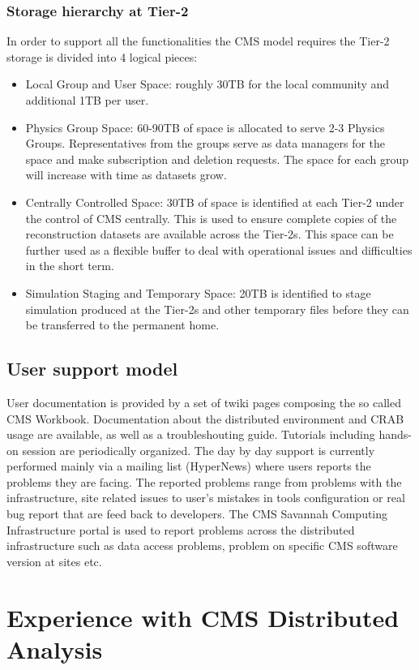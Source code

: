 \subsubsection{Storage hierarchy at Tier-2}
In order to support all the functionalities the CMS model requires the Tier-2 storage is divided into 4 logical pieces:
\begin{itemize}
\item{} Local Group and User Space: roughly 30TB for the local community and additional 1TB per user.
\item{} Physics Group Space: 60-90TB of space is allocated to serve 2-3 Physics Groups. Representatives from the groups serve as data managers for the space and make subscription and deletion requests.
The space for each group will increase with time as datasets grow.
\item{} Centrally Controlled Space: 30TB of space is identified at each Tier-2 under the control of CMS centrally.
This is used to ensure complete copies of the reconstruction datasets are available across the Tier-2s. This space can be further used as a flexible buffer to deal with operational issues and difficulties in the short term.
\item{} Simulation Staging and Temporary Space: 20TB is identified to
stage simulation produced at the Tier-2s and other temporary
files before they can be transferred to the permanent home. 
\end{itemize}

\subsection{User support model}
\label{sec:4_4}
User documentation is provided by a set of twiki pages composing the so called CMS Workbook. Documentation about the distributed environment and CRAB usage are available, as well as a troubleshouting guide.
Tutorials including hands-on session are periodically organized.
The day by day support is currently performed mainly via a mailing list (HyperNews) where users reports the problems they are facing. The reported problems range from problems with the infrastructure, 
site related issues to user's mistakes in tools configuration or real bug report that are feed back to developers.
The CMS Savannah Computing Infrastructure portal is used to report problems across the distributed infrastructure such as data access problems, problem on specific CMS software version at sites etc.

\section{Experience with CMS Distributed Analysis}
\label{sec:5}

